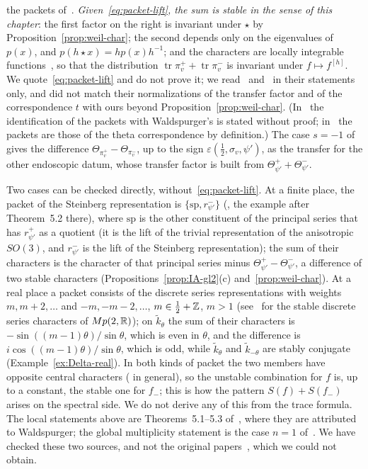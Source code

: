 the packets of~\cite{GS12}. \emph{Given~\eqref{eq:packet-lift}, the sum
is stable in the sense of this chapter}: the first factor on the right is
invariant under $\star$ by Proposition~\ref{prop:weil-char}; the second
depends only on the eigenvalues of $p(x)$, and $p(h\star x)=hp(x)h^{-1}$;
and the characters are locally integrable functions~\cite[\S4]{Li12a}, so
that the distribution $\operatorname{tr}\pi^+_v+\operatorname{tr}\pi^-_v$
is invariant under $f\mapsto f^{[h]}$. We quote~\eqref{eq:packet-lift}
and do not prove it; we read~\cite{Sc98} and~\cite{Lu20} in their
statements only, and did not match their normalizations of the transfer
factor and of the correspondence $t$ with ours beyond
Proposition~\ref{prop:weil-char}. (In~\cite{Sc98} the identification of
the packets with Waldspurger's is stated without proof;
in~\cite{Lu20} the packets are those of the theta correspondence by
definition.) The case $s=-1$ of~\cite{Lu20} gives the difference
$\Theta_{\pi^+_v}-\Theta_{\pi^-_v}$, up to the sign $\varepsilon(\frac12,
\sigma_v,\psi')$, as the transfer for the other endoscopic datum, whose
transfer factor is built from $\Theta^+_{\psi'}+\Theta^-_{\psi'}$.

Two cases can be checked directly, without~\eqref{eq:packet-lift}. At a
finite place, the packet of the Steinberg representation is
$\{\mathrm{sp},r^-_{\psi'}\}$ (\cite[\S5]{GS12}, the example after
Theorem~5.2 there), where $\mathrm{sp}$ is the other constituent of the
principal series that has $r^+_{\psi'}$ as a quotient (it is the lift of
the trivial representation of the anisotropic $SO(3)$, and $r^-_{\psi'}$
is the lift of the Steinberg representation); the sum of their characters
is the character of that principal series minus
$\Theta^+_{\psi'}-\Theta^-_{\psi'}$, a difference of two stable characters
(Propositions~\ref{prop:IA-gl2}(c) and~\ref{prop:weil-char}). At a real
place a packet consists of the discrete series representations with
weights $m,m+2,\dots$ and $-m,-m-2,\dots$, $m\in\frac12+\mathbb{Z}$, $m>1$
(see~\cite{Ad98} for the stable discrete series characters of
$Mp(2,\mathbb{R})$); on
$\tilde k_\theta$ the sum of their characters is $-\sin((m-1)\theta)/
\sin\theta$, which is even in $\theta$, and the difference is
$i\cos((m-1)\theta)/\sin\theta$, which is odd, while $\tilde k_\theta$ and
$\tilde k_{-\theta}$ are stably conjugate (Example~\ref{ex:Delta-real}).
In both kinds of packet the two members have opposite central characters
(\cite[\S5]{GS12} in general), so the unstable combination for $f$ is, up
to a constant, the stable one for $f_-$; this is how the pattern
$S(f)+S(f_-)$ arises on the spectral side. We do not derive any of this
from the trace formula. The local statements above are Theorems~5.1--5.3
of~\cite{GS12}, where they are attributed to Waldspurger; the global
multiplicity statement is the case $n=1$ of~\cite[Theorem~1.4]{GI18}. We
have checked these two sources, and not the original
papers~\cite{Wa80,Wa91}, which we could not obtain.

